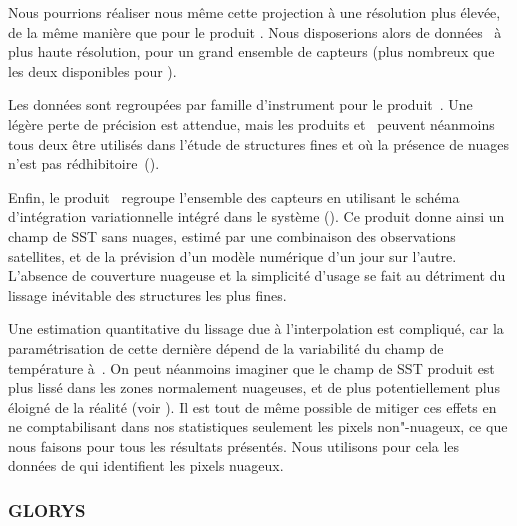 \begin{note}
  Nous pourrions réaliser nous même cette projection à une résolution plus élevée, de la même manière que pour le produit .
  Nous disposerions alors de données~ à plus haute résolution, pour un grand ensemble de capteurs (plus nombreux que les deux disponibles pour ).
\end{note}

Les données sont regroupées par famille d'instrument pour le produit~. Une légère perte de précision est attendue, mais les produits  et~ peuvent néanmoins tous deux être utilisés dans l'étude de structures fines et où la présence de nuages n'est pas rédhibitoire~(\cite{merchant_2019}).

Enfin, le produit~ regroupe l'ensemble des capteurs en utilisant le schéma d'intégration variationnelle  intégré dans le système  (\cite{good_2020}).
Ce produit donne ainsi un champ de SST sans nuages, estimé par une combinaison des observations satellites, et de la prévision d'un modèle numérique d'un jour sur l'autre.
L'absence de couverture nuageuse et la simplicité d'usage se fait au détriment du lissage inévitable des structures les plus fines.

Une estimation quantitative du lissage due à l'interpolation est compliqué, car la paramétrisation de cette dernière dépend de la variabilité du champ de température à~.
On peut néanmoins imaginer que le champ de SST produit est plus lissé dans les zones normalement nuageuses, et de plus potentiellement plus éloigné de la réalité (voir ).
Il est tout de même possible de mitiger ces effets en ne comptabilisant dans nos statistiques seulement les pixels non"-nuageux, ce que nous faisons pour tous les résultats présentés.
Nous utilisons pour cela les données de  qui identifient les pixels nuageux.

\subsubsection{GLORYS}

